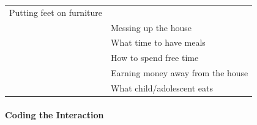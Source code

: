 \documentclass[
]{book}
\begin{document}
\begin{longtable}[]{@{}ll@{}}
\begin{minipage}[t]{0.44\columnwidth}
Putting feet on furniture\strut
\end{minipage}\tabularnewline
\begin{minipage}[t]{0.50\columnwidth}\raggedright
\strut
\end{minipage} & \begin{minipage}[t]{0.44\columnwidth}\raggedright
Messing up the house\strut
\end{minipage}\tabularnewline
\begin{minipage}[t]{0.50\columnwidth}\raggedright
\strut
\end{minipage} & \begin{minipage}[t]{0.44\columnwidth}\raggedright
What time to have meals\strut
\end{minipage}\tabularnewline
\begin{minipage}[t]{0.50\columnwidth}\raggedright
\strut
\end{minipage} & \begin{minipage}[t]{0.44\columnwidth}\raggedright
How to spend free time\strut
\end{minipage}\tabularnewline
\begin{minipage}[t]{0.50\columnwidth}\raggedright
\strut
\end{minipage} & \begin{minipage}[t]{0.44\columnwidth}\raggedright
Earning money away from the house\strut
\end{minipage}\tabularnewline
\begin{minipage}[t]{0.50\columnwidth}\raggedright
\strut
\end{minipage} & \begin{minipage}[t]{0.44\columnwidth}\raggedright
What child/adolescent eats\strut
\end{minipage}\tabularnewline
\bottomrule
\end{longtable}

\hypertarget{coding-the-interaction}{%
\paragraph{Coding the Interaction}\label{coding-the-interaction}}
\end{document}
